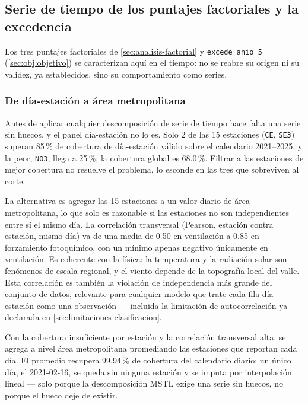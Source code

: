 \subsection{Serie de tiempo de los puntajes factoriales y la excedencia}\label{sec:serie-tiempo}

Los tres puntajes factoriales de \cref{sec:analisis-factorial} y \texttt{excede\_anio\_5}
(\cref{sec:obj:objetivo}) se caracterizan aquí en el tiempo: no se reabre su
origen ni su validez, ya establecidos, sino su comportamiento como series.

\subsubsection{De día-estación a área metropolitana}

Antes de aplicar cualquier descomposición de serie de tiempo hace falta una
serie sin huecos, y el panel día-estación no lo es. Solo 2 de las 15
estaciones (\texttt{CE}, \texttt{SE3}) superan 85\,\% de cobertura de
día-estación válido sobre el calendario 2021--2025, y la peor,
\texttt{NO3}, llega a 25\,\%; la cobertura global es 68.0\,\%. Filtrar a las estaciones de mejor
cobertura no resuelve el problema, lo esconde en las tres que sobreviven al
corte.

La alternativa es agregar las 15 estaciones a un valor diario de área
metropolitana, lo que solo es razonable si las estaciones no son
independientes entre sí el mismo día. La correlación transversal (Pearson,
estación contra estación, mismo día) va de una media de 0.50 en ventilación a
0.85 en forzamiento fotoquímico, con un mínimo apenas negativo únicamente en
ventilación. Es coherente con la física: la temperatura y la radiación solar
son fenómenos de escala regional, y el viento depende de la topografía local
del valle. Esta correlación es también la violación de independencia más
grande del conjunto de datos, relevante para cualquier modelo que trate cada
fila día-estación como una observación --- incluida la limitación de
autocorrelación ya declarada en \cref{sec:limitaciones-clasificacion}.

Con la cobertura insuficiente por estación y la correlación transversal alta,
se agrega a nivel área metropolitana promediando las estaciones que reportan
cada día. El promedio recupera 99.94\,\% de cobertura del calendario diario;
un único día, el 2021-02-16, se queda sin ninguna estación y se imputa por
interpolación lineal --- solo porque la descomposición MSTL exige una serie
sin huecos, no porque el hueco deje de existir.

